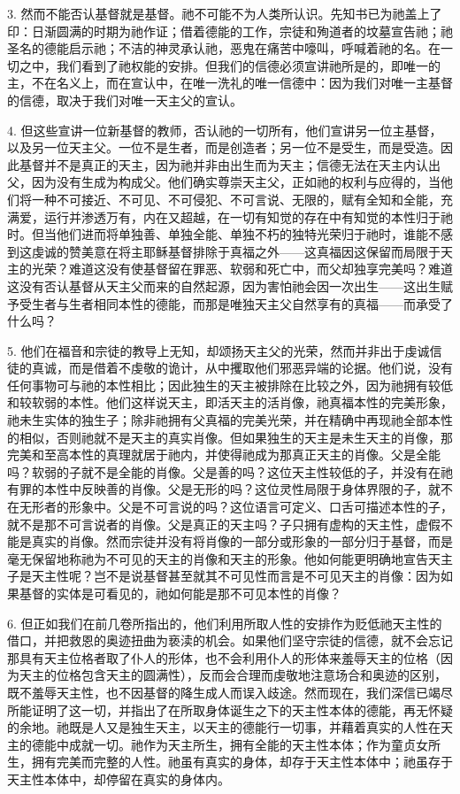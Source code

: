 3. 然而不能否认基督就是基督。祂不可能不为人类所认识。先知书已为祂盖上了印：日渐圆满的时期为祂作证；借着德能的工作，宗徒和殉道者的坟墓宣告祂；祂圣名的德能启示祂；不洁的神灵承认祂，恶鬼在痛苦中嚎叫，呼喊着祂的名。在一切之中，我们看到了祂权能的安排。但我们的信德必须宣讲祂所是的，即唯一的主，不在名义上，而在宣认中，在唯一洗礼的唯一信德中：因为我们对唯一主基督的信德，取决于我们对唯一天主父的宣认。\par

4. 但这些宣讲一位新基督的教师，否认祂的一切所有，他们宣讲另一位主基督，以及另一位天主父。一位不是生者，而是创造者；另一位不是受生，而是受造。因此基督并不是真正的天主，因为祂并非由出生而为天主；信德无法在天主内认出父，因为没有生成为构成父。他们确实尊崇天主父，正如祂的权利与应得的，当他们将一种不可接近、不可见、不可侵犯、不可言说、无限的，赋有全知和全能，充满爱，运行并渗透万有，内在又超越，在一切有知觉的存在中有知觉的本性归于祂时。但当他们进而将单独善、单独全能、单独不朽的独特光荣归于祂时，谁能不感到这虔诚的赞美意在将主耶稣基督排除于真福之外——这真福因这保留而局限于天主的光荣？难道这没有使基督留在罪恶、软弱和死亡中，而父却独享完美吗？难道这没有否认基督从天主父而来的自然起源，因为害怕祂会因一次出生——这出生赋予受生者与生者相同本性的德能，而那是唯独天主父自然享有的真福——而承受了什么吗？\par

5. 他们在福音和宗徒的教导上无知，却颂扬天主父的光荣，然而并非出于虔诚信徒的真诚，而是借着不虔敬的诡计，从中攫取他们邪恶异端的论据。他们说，没有任何事物可与祂的本性相比；因此独生的天主被排除在比较之外，因为祂拥有较低和较软弱的本性。他们这样说天主，即活天主的活肖像，祂真福本性的完美形象，祂未生实体的独生子；除非祂拥有父真福的完美光荣，并在精确中再现祂全部本性的相似，否则祂就不是天主的真实肖像。但如果独生的天主是未生天主的肖像，那完美和至高本性的真理就居于祂内，并使得祂成为那真正天主的肖像。父是全能吗？软弱的子就不是全能的肖像。父是善的吗？这位天主性较低的子，并没有在祂有罪的本性中反映善的肖像。父是无形的吗？这位灵性局限于身体界限的子，就不在无形者的形象中。父是不可言说的吗？这位语言可定义、口舌可描述本性的子，就不是那不可言说者的肖像。父是真正的天主吗？子只拥有虚构的天主性，虚假不能是真实的肖像。然而宗徒并没有将肖像的一部分或形象的一部分归于基督，而是毫无保留地称祂为不可见的天主的肖像和天主的形象。他如何能更明确地宣告天主子是天主性呢？岂不是说基督甚至就其不可见性而言是不可见天主的肖像：因为如果基督的实体是可看见的，祂如何能是那不可见本性的肖像？\par

6. 但正如我们在前几卷所指出的，他们利用所取人性的安排作为贬低祂天主性的借口，并把救恩的奥迹扭曲为亵渎的机会。如果他们坚守宗徒的信德，就不会忘记那具有天主位格者取了仆人的形体，也不会利用仆人的形体来羞辱天主的位格（因为天主的位格包含天主的圆满性），反而会合理而虔敬地注意场合和奥迹的区别，既不羞辱天主性，也不因基督的降生成人而误入歧途。然而现在，我们深信已竭尽所能证明了这一切，并指出了在所取身体诞生之下的天主性本体的德能，再无怀疑的余地。祂既是人又是独生天主，以天主的德能行一切事，并藉着真实的人性在天主的德能中成就一切。祂作为天主所生，拥有全能的天主性本体；作为童贞女所生，拥有完美而完整的人性。祂虽有真实的身体，却存于天主性本体中；祂虽存于天主性本体中，却停留在真实的身体内。\par

